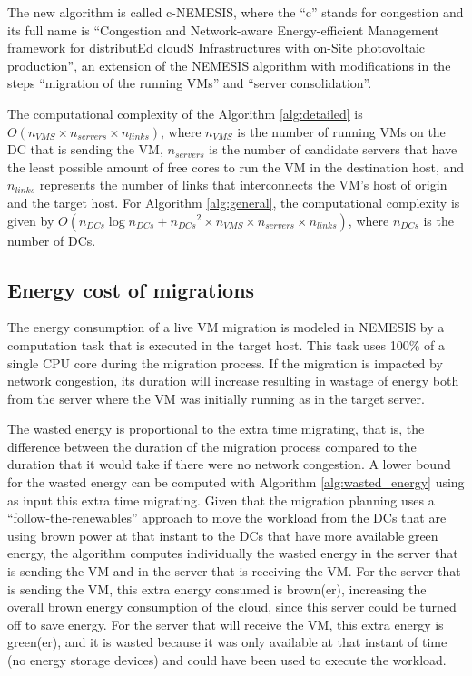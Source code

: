 The new algorithm is called c-NEMESIS, where the ``c'' stands for congestion and its full name is ``Congestion and Network-aware Energy-efficient Management framework for distributEd cloudS Infrastructures with on-Site photovoltaic production'', an extension of the NEMESIS algorithm with modifications in the steps ``migration of the running VMs'' and  ``server consolidation''.


The computational complexity of the Algorithm \ref{alg:detailed} is
$O(n_{VMS} \times  n_{servers} \times n_{links}  )$, where $n_{VMS}$
is the number of running VMs on the DC that is sending the VM, $n_{servers}$ is the number of candidate
servers that have the least possible amount of free cores to run the
VM in the destination host, and $n_{links}$ represents the number of
links that interconnects the VM's host of origin and the target
host. For Algorithm \ref{alg:general}, the computational complexity
is given by $O(n_{DCs}\log{}n_{DCs} + {n_{DCs}}^{2} \times
n_{VMS} \times  n_{servers} \times n_{links})$, where $n_{DCs}$ is the
number of DCs.


\subsection{Energy cost of migrations}\label{sec:energy_costs_mig}

The energy consumption of a live VM migration is modeled in NEMESIS by a computation task that is executed in the target host. This task uses 100\% of a single CPU core during the migration process. If the migration is impacted by network congestion, its duration will increase resulting in wastage of energy both from the server where the VM was initially running as in the target server.


The wasted energy is proportional to the extra time migrating, that is, the difference between the duration of the migration process
compared to the duration that it would take if there were no network congestion. A lower bound for the wasted energy can be computed with Algorithm \ref{alg:wasted_energy} using as input this extra time migrating. Given that the migration planning uses a ``follow-the-renewables'' approach to move the workload from the DCs that are using brown power at that instant to the DCs that have more available green energy, the algorithm computes individually the wasted energy in the server that is sending the VM and in the server that is receiving the VM. For the server that is sending the VM, this extra energy consumed is brown(er), increasing the overall brown energy consumption of the cloud, since this server could be turned off to save energy. For the server that will receive the VM, this extra energy is green(er), and it is wasted because it was only available at that instant of time (no energy storage devices) and could have been used to execute the workload.


